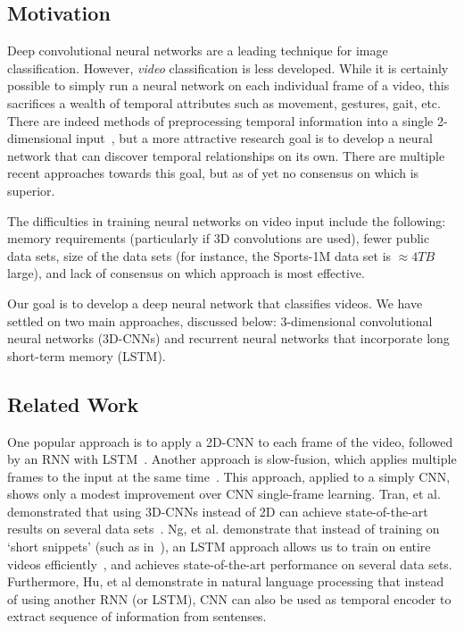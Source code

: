 \subsection*{Motivation}
Deep convolutional neural networks are a leading technique for image classification.
However, \emph{video} classification is less developed.
While it is certainly possible to simply run a neural network on each individual frame of a video, this sacrifices a wealth of temporal attributes such as movement, gestures, gait, etc.
There are indeed methods of preprocessing temporal information into a single 2-dimensional input~\cite{brox}, but a more attractive research goal is to develop a neural network that can discover temporal relationships on its own.
There are multiple recent approaches towards this goal, but as of yet no consensus on which is superior.

The difficulties in training neural networks on video input include the following: memory requirements (particularly if 3D convolutions are used), fewer public data sets, size of the data sets (for instance, the Sports-1M data set is $\approx 4TB$ large), and lack of consensus on which approach is most effective. 

Our goal is to develop a deep neural network that classifies videos.
We have settled on two main approaches, discussed below: 3-dimensional convolutional neural networks (3D-CNNs) and recurrent neural networks that incorporate long short-term memory (LSTM).  

\subsection*{Related Work}

One popular approach is to apply a 2D-CNN to each frame of the video, followed by an RNN with LSTM~\cite{ltrcn}. 
Another approach is slow-fusion, which applies multiple frames to the input at the same time~\cite{cnnvid}. This approach, applied to a simply CNN, shows only a modest improvement over CNN single-frame learning.
Tran, et al. demonstrated that using 3D-CNNs instead of 2D can achieve state-of-the-art results on several data sets~\cite{stf}.
Ng, et al. demonstrate that instead of training on `short snippets' (such as in~\cite{cnnvid,stf}), an LSTM approach allows us to train on entire videos efficiently~\cite{snip}, and achieves state-of-the-art performance on several data sets. Furthermore, Hu, et al \cite{cnnMNLS} demonstrate in natural language processing that instead of using another RNN (or LSTM), CNN can also be used as temporal encoder to extract sequence of information from sentenses. 

